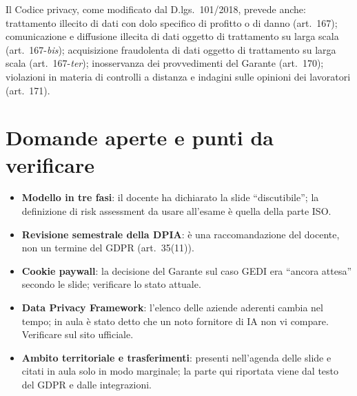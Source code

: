 \begin{integrazione}
Il Codice privacy, come modificato dal D.lgs.~101/2018, prevede anche: trattamento illecito di dati con
dolo specifico di profitto o di danno (art.~167); comunicazione e diffusione illecita di dati oggetto di
trattamento su larga scala (art.~167-\emph{bis}); acquisizione fraudolenta di dati oggetto di trattamento
su larga scala (art.~167-\emph{ter}); inosservanza dei provvedimenti del Garante (art.~170); violazioni in
materia di controlli a distanza e indagini sulle opinioni dei lavoratori (art.~171).
\end{integrazione}

\section{Domande aperte e punti da verificare}
\begin{verifica}
\begin{itemize}
  \item \textbf{Modello in tre fasi}: il docente ha dichiarato la slide ``discutibile''; la definizione
    di risk assessment da usare all'esame è quella della parte ISO.
  \item \textbf{Revisione semestrale della DPIA}: è una raccomandazione del docente, non un termine del
    GDPR (art.~35(11)).
  \item \textbf{Cookie paywall}: la decisione del Garante sul caso GEDI era ``ancora attesa'' secondo le
    slide; verificare lo stato attuale.
  \item \textbf{Data Privacy Framework}: l'elenco delle aziende aderenti cambia nel tempo; in aula è stato
    detto che un noto fornitore di IA non vi compare. Verificare sul sito ufficiale.
  \item \textbf{Ambito territoriale e trasferimenti}: presenti nell'agenda delle slide e citati in
    aula solo in modo marginale; la parte qui riportata viene dal testo del GDPR e dalle integrazioni.
\end{itemize}
\end{verifica}
